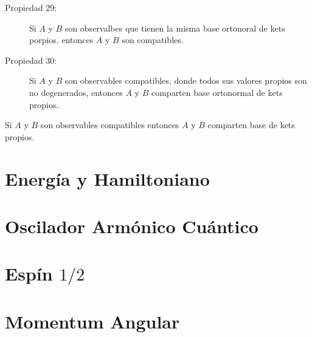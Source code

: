 \begin{description}
	\item[Propiedad 29: ] Si $A$ y $B$ son observalbes que tienen la misma base ortonoral de kets porpios, entonces $A$ y $B$ son compatibles.
	\item[Propiedad 30: ] Si $A$ y $B$ son observables compatibles, donde todos sus valores propios son no degenerados, entonces $A$ y $B$ comparten base ortonormal de kets propios.
\end{description}

\begin{teorema}
	Si $A$ y $B$ son observables compatibles entonces $A$ y $B$ comparten base de kets propios.
\end{teorema}














\chapter{Energía y Hamiltoniano}








\chapter{Oscilador Armónico Cuántico}








\chapter{Espín $1/2$}










\chapter{Momentum Angular}



























